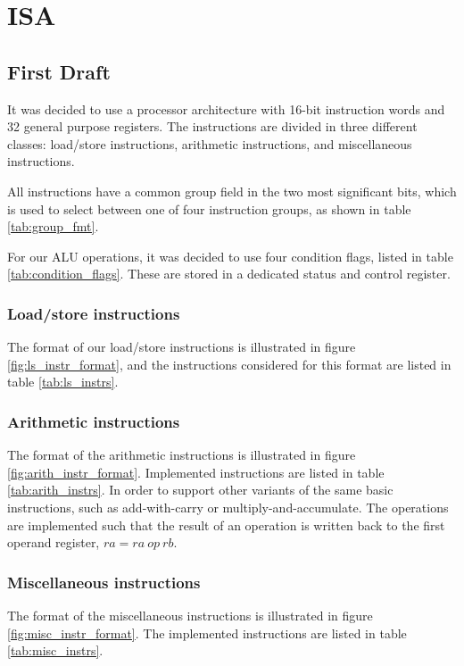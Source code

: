 \section{ISA}

\subsection{First Draft}
It was decided to use a processor architecture with 16-bit instruction words
and 32 general purpose registers. The instructions are divided in three
different classes: load/store instructions, arithmetic instructions, and
miscellaneous instructions.

All instructions have a common group field in the two most significant bits,
which is used to select between one of four instruction groups, as shown in
table \ref{tab:group_fmt}.

For our ALU operations, it was decided to use four condition flags, listed in
table \ref{tab:condition_flags}. These are stored in a dedicated status and
control register.




\subsubsection{Load/store instructions}
The format of our load/store instructions is illustrated in figure
\ref{fig:ls_instr_format}, and the instructions considered for this format
are listed in table \ref{tab:ls_instrs}.




\subsubsection{Arithmetic instructions}
The format of the arithmetic instructions is illustrated in figure
\ref{fig:arith_instr_format}.
Implemented instructions are listed in table \ref{tab:arith_instrs}. In order
to support other variants of the same basic instructions, such as add-with-carry
or multiply-and-accumulate. The operations are implemented such that the result
of an operation is written back to the first operand register, $ra = ra~op~rb$.




\subsubsection{Miscellaneous instructions}
The format of the miscellaneous instructions is illustrated in figure
\ref{fig:misc_instr_format}. The implemented instructions are listed in table
\ref{tab:misc_instrs}.

